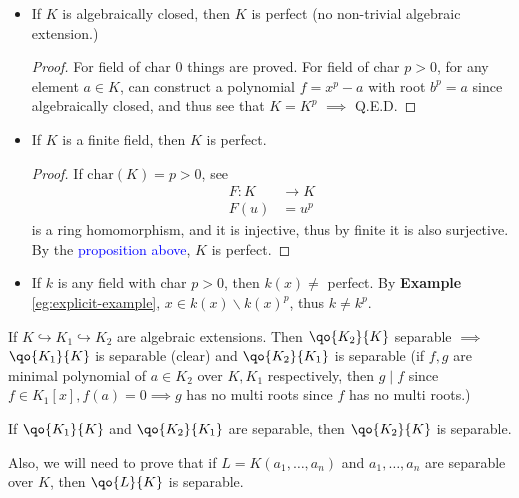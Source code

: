 \begin{eg}
	\leavevmode
	\begin{itemize}
		\item If \( K \) is algebraically closed, then \( K \) is perfect (no non-trivial algebraic extension.)
		      \begin{proof}
			      For field of char \( 0 \) things are proved. For field of char \( p > 0 \), for any element
			      \( a \in K \), can construct a polynomial \( f = x^p - a \) with root \( b^p = a \) since
			      algebraically closed, and thus see that \( K = K^p \) \( \implies \) Q.E.D.
		      \end{proof}
		\item If \( K \) is a finite field, then \( K \) is perfect.
		      \begin{proof}
			      If \( \text{char}(K) = p > 0 \), see
			      \begin{align*}
				      F :K & \to K \\
				      F(u) & = u^p
			      \end{align*}
			      is a ring homomorphism, and it is injective, thus by finite it is also surjective. By the
			      \textcolor{blue}{proposition above}, \( K \) is perfect.
		      \end{proof}
		\item If \( k \) is any field with char \( p > 0 \), then \( k(x) \ne  \) perfect. By
		      \textbf{Example} \ref{eg:explicit-example}, \( x \in k(x) \smallsetminus k(x)^p \), thus \( k \ne k^p\).
	\end{itemize}
\end{eg}

\begin{remark}
	If \( K \hookrightarrow K_1 \hookrightarrow K_2 \) are algebraic extensions. Then \( \qo{K_2}{K} \) separable \( \implies \)
	\( \qo{K_1}{K} \) is separable (clear) and \( \qo{K_2}{K_1} \) is separable (if \( f,g \) are
	minimal polynomial of \( a \in K_2 \) over \( K, K_1 \) respectively, then \( g \mid f \) since \(
	f \in K_1[x], f(a) = 0 \implies g \) has no multi roots since \( f \) has no multi roots.)
\end{remark}

\begin{fact}
	If \( \qo{K_1}{K} \) and \( \qo{K_2}{K_1} \) are separable, then \( \qo{K_2}{K} \) is separable. 
\end{fact}

\begin{remark}
	Also, we will need to prove that if \( L = K(a_1,\ldots, a_n) \) and \( a_1,\ldots, a_n \) are
	separable over \( K \), then \( \qo{L}{K} \) is separable.
\end{remark}

